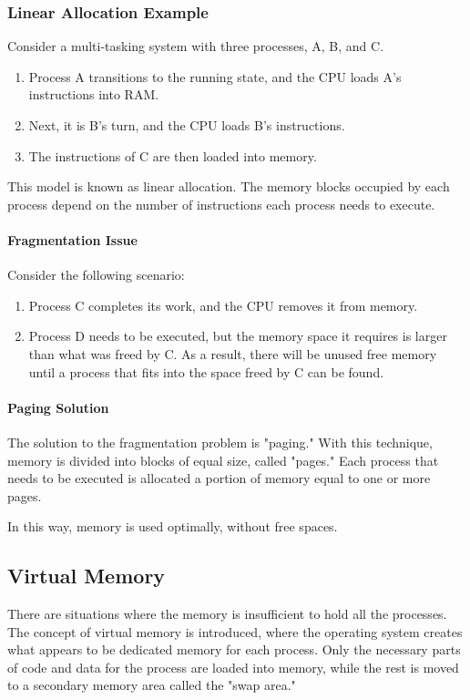 \subsubsection{Linear Allocation Example}
Consider a multi-tasking system with three processes, A, B, and C.

\begin{enumerate}
    \item Process A transitions to the running state, and the CPU loads A's instructions into RAM.
    \item Next, it is B's turn, and the CPU loads B's instructions.
    \item The instructions of C are then loaded into memory.
\end{enumerate}

This model is known as linear allocation. The memory blocks occupied by each process depend on the number of instructions each process needs to execute.

\paragraph{Fragmentation Issue}
Consider the following scenario:
\begin{enumerate}
    \item Process C completes its work, and the CPU removes it from memory.
    \item Process D needs to be executed, but the memory space it requires is larger than what was freed by C. As a result, there will be unused free memory until a process that fits into the space freed by C can be found.
\end{enumerate}

\paragraph{Paging Solution}
The solution to the fragmentation problem is "paging." With this technique, memory is divided into blocks of equal size, called "pages." Each process that needs to be executed is allocated a portion of memory equal to one or more pages.

In this way, memory is used optimally, without free spaces.

\subsection{Virtual Memory}
There are situations where the memory is insufficient to hold all the processes. The concept of virtual memory is introduced, where the operating system creates what appears to be dedicated memory for each process. Only the necessary parts of code and data for the process are loaded into memory, while the rest is moved to a secondary memory area called the "swap area."

